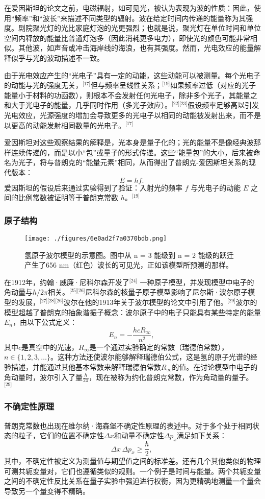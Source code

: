在爱因斯坦的论文之前，电磁辐射，如可见光，被认为表现为波的性质：因此，使用“频率”和“波长”来描述不同类型的辐射。波在给定时间内传递的能量称为其强度。剧院聚光灯的光比家庭灯泡的光更强烈；也就是说，聚光灯在单位时间和单位空间内释放的能量比普通灯泡多（因此消耗更多电力），即使光的颜色可能非常相似。其他波，如声音或冲击海岸线的海浪，也有其强度。然而，光电效应的能量解释似乎与光的波动描述不一致。

由于光电效应产生的“光电子”具有一定的动能，这些动能可以被测量。每个光电子的动能与光的强度无关，\(^\text{[17]}\)但与频率呈线性关系；\(^\text{[19]}\)如果频率过低（对应的光子能量小于材料的功函数），则根本不会发射任何光电子，除非多个光子，其能量之和大于光电子的能量，几乎同时作用（多光子效应）。\(^\text{[22][23]}\)假设频率足够高以引发光电效应，光源强度的增加会导致更多的光电子以相同的动能被发射出来，而不是以更高的动能发射相同数量的光电子。\(^\text{[17]}\)

爱因斯坦对这些观察结果的解释是，光本身是量子化的；光的能量不是像经典波那样连续传递的，而是以小“包”或量子的形式传递。这些“能量包”的大小，后来被命名为光子，将与普朗克的“能量元素”相同，从而得出了普朗克-爱因斯坦关系的现代版本：
\[
E = hf.~
\]
爱因斯坦的假设后来通过实验得到了验证：入射光的频率 \( f \) 与光电子的动能 \( E \) 之间的比例常数被证明等于普朗克常数 \( h \)。\(^\text{[19]}\)
\subsubsection{原子结构}  
\begin{figure}[ht]
\centering
\texttt{[image: ./figures/6e0ad2f7a0370bdb.png]}
\caption{氢原子波尔模型的示意图。图中从 n = 3 能级到 n = 2 能级的跃迁产生了656 nm（红色）波长的可见光，正如该模型所预测的那样。} \label{fig_PLKCS_4}
\end{figure}
在1912年，约翰·威廉·尼科尔森开发了\(^\text{[24]}\) 一种原子模型，并发现模型中电子的角动量与\(h/2\pi\)相关。\(^\text{[25][26]}\)尼科尔森的核量子原子模型影响了尼尔斯·波尔原子模型的发展，\(^\text{[27][28][26]}\)波尔在他的1913年关于波尔模型的论文中引用了他。\(^\text{[29]}\)波尔的模型超越了普朗克的抽象谐振子概念：波尔原子中的电子只能具有某些特定的能量\( E_n \)，由以下公式定义：
\[
E_n = -\frac{hcR_{\infty}}{n^2},~
\]
其中\( c \)是真空中的光速，\( R_{\infty} \)是一个通过实验确定的常数（瑞德伯常数），\( n \in \{1, 2, 3, \dots\} \)。这种方法还使波尔能够解释瑞德伯公式，这是氢的原子光谱的经验描述，并能通过其他基本常数来解释瑞德伯常数\(R_{\infty}\)的值。在讨论模型中电子的角动量时，波尔引入了量\(\frac{h}{2\pi} \)，现在被称为约化普朗克常数，作为角动量的量子。\(^\text{[29]}\)
\subsubsection{不确定性原理}  
普朗克常数也出现在维尔纳·海森堡不确定性原理的表述中。对于多个处于相同状态的粒子，它们的位置不确定性\( \Delta x \)和动量不确定性\( \Delta p_x \)满足如下关系：
\[
\Delta x \, \Delta p_x \geq \frac{\hbar}{2},~
\]
其中，不确定性被定义为测量值与期望值之间的标准差。还有几个其他类似的物理可测共轭变量对，它们也遵循类似的规则。一个例子是时间与能量。两个共轭变量之间的不确定性反比关系在量子实验中强迫进行权衡，因为更精确地测量一个量会导致另一个量变得不精确。

